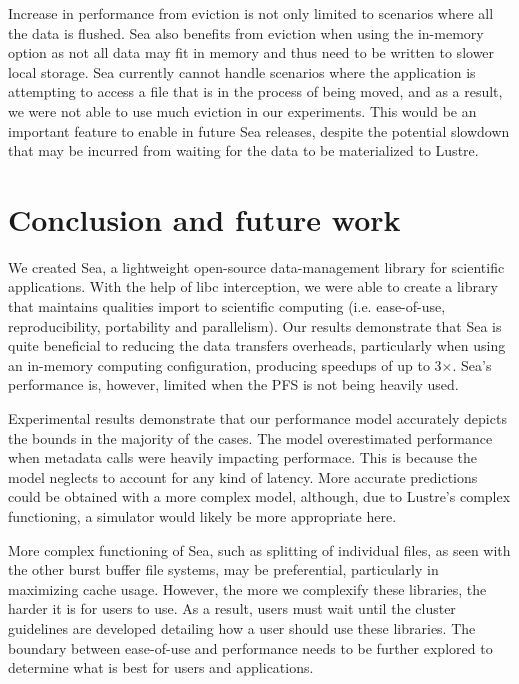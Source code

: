    Increase in performance from eviction is not only limited to scenarios where
    all the data is flushed. Sea also benefits from eviction when using the
    in-memory option as not all data may fit in memory and thus need to be
    written to slower local storage. Sea currently cannot handle scenarios where
    the application is attempting to access a file that is in the process of being
    moved, and as a result, we were not able to use much eviction in our experiments.
    This would be an important feature to enable in future Sea releases, despite the potential
    slowdown that may be incurred from waiting for the data to be materialized to Lustre.

\section{Conclusion and future work}

    We created Sea, a lightweight open-source data-management library for
    scientific applications. With the help of libc interception, we were able to
    create a library that maintains qualities import to scientific computing
    (i.e. ease-of-use, reproducibility, portability and parallelism). Our
    results demonstrate that Sea is quite beneficial to reducing the data
    transfers overheads, particularly when using an in-memory computing
    configuration, producing speedups of up to 3$\times$. Sea's performance is,
    however, limited when the PFS is not being heavily used.

    Experimental results demonstrate that our performance model accurately
    depicts the bounds in the majority of the cases. The model overestimated
    performance when metadata calls were heavily impacting performace. This is
    because the model neglects to account for any kind of latency. More accurate
    predictions could be obtained with a more complex model, although, due to
    Lustre's complex functioning, a simulator would likely be more appropriate
    here.

    More complex functioning of Sea, such as splitting of individual files, as
    seen with the other burst buffer file systems, may be preferential,
    particularly in maximizing cache usage. However, the more we complexify
    these libraries, the harder it is for users to use. As a result, users must
    wait until the cluster guidelines are developed detailing how a user should
    use these libraries. The boundary between ease-of-use and performance needs to be
    further explored to determine what is best for users and applications.



